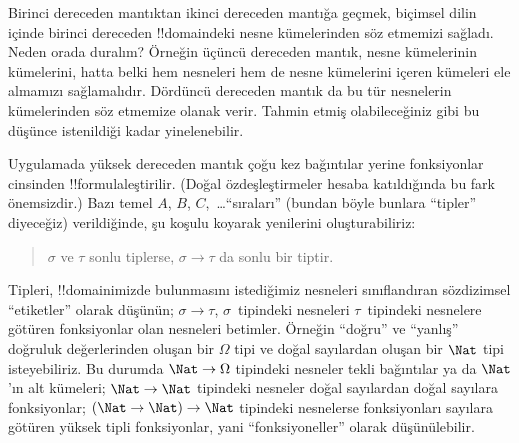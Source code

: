 \documentclass[../../../include/open-logic-section]{subfiles}
\begin{document}


Birinci dereceden mantıktan ikinci dereceden mantığa geçmek, biçimsel dilin
içinde birinci dereceden !!{domain}{}deki nesne kümelerinden söz etmemizi
sağladı. Neden orada duralım? Örneğin üçüncü dereceden mantık, nesne
kümelerinin kümelerini, hatta belki hem nesneleri hem de nesne kümelerini
içeren kümeleri ele almamızı sağlamalıdır. Dördüncü dereceden mantık da bu
tür nesnelerin kümelerinden söz etmemize olanak verir. Tahmin etmiş
olabileceğiniz gibi bu düşünce istenildiği kadar yinelenebilir.

Uygulamada yüksek dereceden mantık çoğu kez bağıntılar yerine fonksiyonlar
cinsinden !!{formula}{}leştirilir. (Doğal özdeşleştirmeler hesaba katıldığında bu fark
önemsizdir.) Bazı temel $A$, $B$, $C$,~\dots ``sıraları'' (bundan böyle bunlara
``tipler'' diyeceğiz) verildiğinde, şu koşulu koyarak yenilerini
oluşturabiliriz:
\begin{quote}
$\sigma$ ve $\tau$ sonlu tiplerse, $\sigma \to \tau$ da sonlu bir tiptir.
\end{quote}
Tipleri, !!{domain}{}imizde bulunmasını istediğimiz nesneleri sınıflandıran
sözdizimsel ``etiketler'' olarak düşünün; $\sigma \to \tau$, $\sigma$~tipindeki
nesneleri $\tau$~tipindeki nesnelere götüren fonksiyonlar olan nesneleri
betimler. Örneğin ``doğru'' ve ``yanlış'' doğruluk değerlerinden oluşan bir
$\Omega$ tipi ve doğal sayılardan oluşan bir $\Nat$ tipi isteyebiliriz. Bu
durumda $\Nat \to \Omega$ tipindeki nesneler tekli bağıntılar ya da $\Nat$'ın
alt kümeleri; $\Nat \to \Nat$ tipindeki nesneler doğal sayılardan doğal
sayılara fonksiyonlar; $(\Nat \to \Nat) \to \Nat$ tipindeki nesnelerse
fonksiyonları sayılara götüren yüksek tipli fonksiyonlar, yani
``fonksiyoneller'' olarak düşünülebilir.
\end{document}
